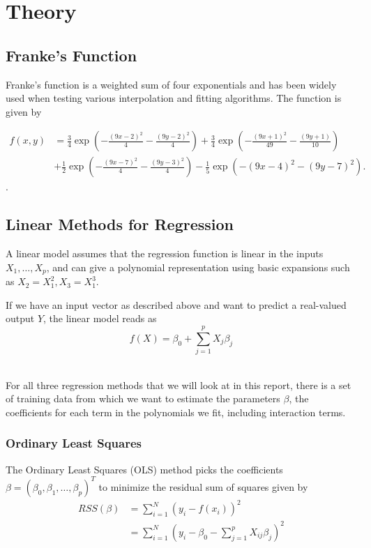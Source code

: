 \section{Theory}

\subsection{Franke's Function}

Franke's function is a weighted sum of four exponentials and has been 
widely used when testing various interpolation and fitting algorithms.
The function is given by 

\begin{align*}
	f(x,y) &= 
	\frac{3}{4}\exp{\left(-\frac{(9x-2)^2}{4} 
	- \frac{(9y-2)^2}{4}\right)}
	+\frac{3}{4}\exp{\left(-\frac{(9x+1)^2}{49}
	- \frac{(9y+1)}{10}\right)} \\
	&+\frac{1}{2}\exp{\left(-\frac{(9x-7)^2}{4} 
	- \frac{(9y-3)^2}{4}\right)} 
	-\frac{1}{5}\exp{\left(-(9x-4)^2 - (9y-7)^2\right) }.
\end{align*}. 
~\cite{Project1}

\subsection{Linear Methods for Regression}

A linear model assumes that the regression function is linear in the 
inputs \(X_1, \dots, X_p\), and can give a polynomial representation
using basic expansions such as \(X_2 = X_1^2, X_3 = X_1^3\). 

If we have an input vector as described above and want to predict 
a real-valued output \(Y\), the linear model reads as
\begin{equation}
	f(X) = \beta_0 + \sum\limits_{j=1}^p X_j\beta_j
\end{equation}
~\cite{IntroStatistics}

For all three regression methods that we will look at in this report, 
there is a set of training data from which we want to estimate the parameters 
\(\beta\), the coefficients for each term in the polynomials we fit, including
interaction terms.

\subsubsection{Ordinary Least Squares}\label{sec:ols}
The Ordinary Least Squares (OLS) method picks the coefficients
\(\beta = (\beta_0, \beta_1, \dots, \beta_p)^T\) to minimize the 
residual sum of squares given by
\begin{align}
	RSS(\beta) &= \sum\limits_{i=1}^N (y_i - f(x_i))^2\\
				&= \sum\limits_{i=1}^N 
				(y_i - \beta_0 - \sum\limits_{j=1}^p X_{ij}\beta_j )^2\\
\end{align}


